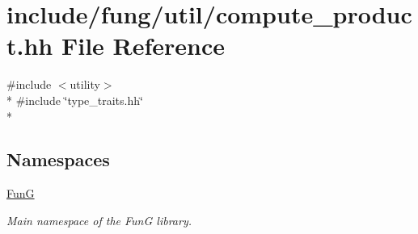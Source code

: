 \hypertarget{compute__product_8hh}{\section{include/fung/util/compute\-\_\-product.hh File Reference}
\label{compute__product_8hh}
}
{\ttfamily \#include $<$utility$>$}\\*
{\ttfamily \#include \char`\"{}type\-\_\-traits.\-hh\char`\"{}}\\*
\subsection*{Namespaces}
\begin{DoxyCompactItemize}
\item 
\hyperlink{namespaceFunG}{Fun\-G}
\begin{DoxyCompactList}\small\item\em Main namespace of the Fun\-G library. \end{DoxyCompactList}\end{DoxyCompactItemize}
